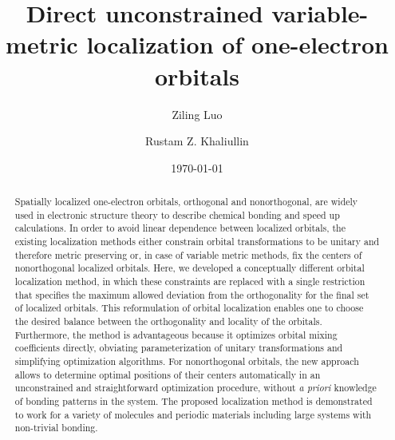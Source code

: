 \documentclass[aps,prl,reprint,amsmath,amssymb]{revtex4-1}
\begin{document}


\title{
Direct unconstrained variable-metric localization of one-electron orbitals
}

\author{Ziling Luo}
\author{Rustam Z. Khaliullin}

\date{\today}

\begin{abstract}
Spatially localized one-electron orbitals, orthogonal and nonorthogonal, are widely used in electronic structure theory to describe chemical bonding and speed up calculations.
In order to avoid linear dependence between localized orbitals, the existing localization methods either constrain orbital transformations to be unitary and therefore metric preserving or, in case of variable metric methods, fix the centers of nonorthogonal localized orbitals. 
Here, we developed a conceptually different orbital localization method, in which these constraints are replaced with a single restriction that specifies the maximum allowed deviation from the orthogonality for the final set of localized orbitals. 
This reformulation of orbital localization enables one to choose the desired balance between the orthogonality and locality of the orbitals. 
Furthermore, the method is advantageous because it optimizes orbital mixing coefficients directly, obviating parameterization of unitary transformations and simplifying optimization algorithms. 
For nonorthogonal orbitals, the new approach allows to determine optimal positions of their centers automatically in an unconstrained and straightforward optimization procedure, without \emph{a priori} knowledge of bonding patterns in the system. 
The proposed localization method is demonstrated to work for a variety of molecules and periodic materials including large systems with non-trivial bonding. 
\end{abstract}



\maketitle
\end{document}
